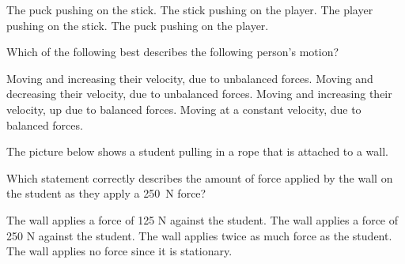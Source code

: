 \documentclass[]{exam}
\begin{document}
\begin{questions}
\begin{randomizechoices}[norandomize]
    \correctchoice The puck pushing on the stick.
    \choice The stick pushing on the player.
    \choice The player pushing on the stick.
    \choice The puck pushing on the player.
\end{randomizechoices}


\question 
Which of the following best describes the following person's motion?


\begin{center}
\end{center}

\begin{randomizechoices}[norandomize]
    \choice Moving and increasing their velocity, due to unbalanced forces.
    \choice Moving and decreasing their velocity, due to unbalanced forces.
    \choice Moving and increasing their velocity, up due to balanced forces.
    \correctchoice Moving at a constant velocity, due to balanced forces.
\end{randomizechoices}

\question 
The picture below shows a student pulling in a rope that is attached to a wall.

\begin{center}
\end{center}

Which statement correctly describes the amount of force applied by the wall on the student as they apply a \SI{250}{N} force?
    
\begin{randomizechoices}[norandomize]
    \choice The wall applies a force of 125 N against the student.
    \correctchoice The wall applies a force of 250 N against the student.
    \choice The wall applies twice as much force as the student.
    \choice The wall applies no force since it is stationary.
\end{randomizechoices}


\end{questions}
\end{document}
